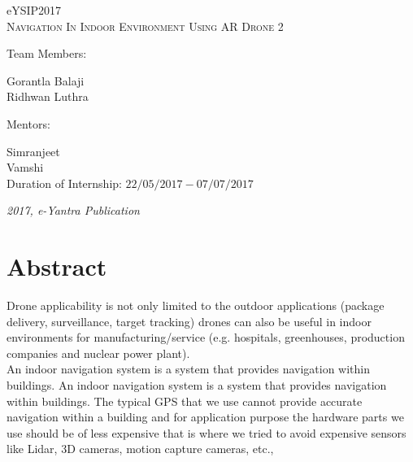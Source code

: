 \documentclass[a4paper,12pt,oneside]{book}
\begin{document}
\begin{titlepage}
\raggedright
{\Large eYSIP2017\\[1cm]}
{\Huge\scshape  Navigation In Indoor  Environment Using AR Drone 2 \\[.1in]}
\vfill

{\large \hspace{3in} Team Members: \\}
\begin{flushright}
{\large Gorantla Balaji \\}
{\large Ridhwan Luthra \\} 
\end{flushright}
{\large \hspace{3.6in} Mentors: \\}
\begin{flushright}
{\large Simranjeet \\}
{\large Vamshi \\}
\vspace{5mm}
{\large Duration of Internship: $ 22/05/2017-07/07/2017 $ \\}
\end{flushright}
\vspace{5mm}
{\itshape 2017, e-Yantra Publication}
\end{titlepage}

\tableofcontents


\chapter[Abstract]{Abstract}
Drone applicability is not only limited to the outdoor applications (package delivery, surveillance, target tracking) drones can also be useful in indoor environments for manufacturing/service (e.g. hospitals, greenhouses, production companies and nuclear power plant). \\
\hspace*{0.2in} An indoor navigation system is a system that provides navigation within buildings. An indoor navigation system is a system that provides navigation within buildings. The typical GPS that we use cannot provide accurate navigation within a building and for application purpose the hardware parts we use should be of less expensive that is where we tried to avoid expensive sensors like Lidar, 3D cameras, motion capture cameras, etc., 
\end{document}

